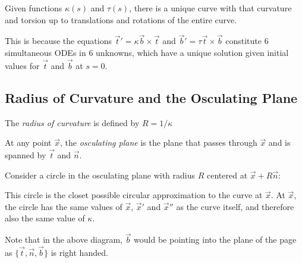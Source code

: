 \documentclass[../main.tex]{subfiles}
\begin{document}
\begin{remark}
  \nonexaminable
  Given functions $\kappa(s)$ and $\tau(s)$, there is a unique curve with that curvature and torsion up to translations and rotations of the entire curve.

  This is because the equations $\vec{t}' = \kappa \vec{b} \times \vec{t}$ and $\vec{b}' = \tau \vec{t} \times \vec{b}$ constitute 6 simultaneous ODEs in 6 unknowns, which have a unique solution given initial values for $\vec{t}$ and $\vec{b}$ at $s = 0$.
\end{remark}
\subsection{Radius of Curvature and the Osculating Plane}
\begin{definition}
  The \textit{radius of curvature} is defined by $R = 1/\kappa$
\end{definition}
\begin{definition}
  At any point $\vec{x}$, the \textit{osculating plane} is the plane that passes through $\vec{x}$ and is spanned by $\vec{t}$ and $\vec{n}$.
\end{definition}
Consider a circle in the osculating plane with radius $R$ centered at $\vec{x} + R\vec{n}$:
\begin{center}
\end{center}
This circle is the closet possible circular approximation to the curve at $\vec{x}$.
At $\vec{x}$, the circle has the same values of $\vec{x}$, $\vec{x}'$ and $\vec{x}''$ as the curve itself, and therefore also the same value of $\kappa$.

Note that in the above diagram, $\vec{b}$ would be pointing into the plane of the page as $\{\vec{t}, \vec{n}, \vec{b}\}$ is right handed.
\end{document}
